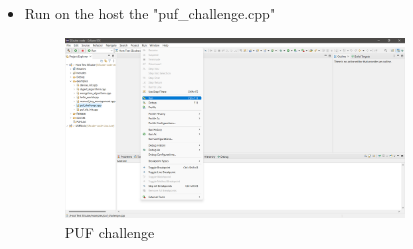 \begin{itemize}
\item {Run on the host the "puf\_challenge.cpp"}
\begin{figure}[H]
\centering
  \includegraphics[width=9cm]{../../images/puf_challenge.png}
  \caption{PUF challenge}
  \label{fig:Puf challenge}
\end{figure}

\end{itemize}




